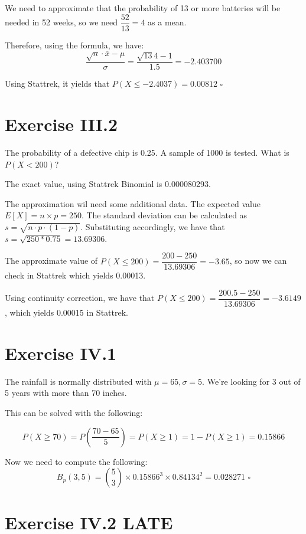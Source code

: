 \documentclass[titlepage, letterpaper]{article}
\newcommand{\qed}{\,\,\square}
\begin{document}
We need to approximate that the probability of 13 or more batteries will be needed in 52 weeks, so we need $\dfrac{52}{13} = 4$ as a mean.

Therefore, using the formula, we have:
$$\dfrac{\sqrt{n} \cdot \overline{x} - \mu}{\sigma} = \dfrac{\sqrt{13} 4 - 1}{1.5} = -2.403700$$

Using Stattrek, it yields that $P(X \leq -2.4037) = 0.00812 \qed$


\section{Exercise III.2} %
\label{sec:exercise_iii_2}
The probability of a defective chip is 0.25.
A sample of 1000 is tested.
What is $P(X<200)$?

The exact value, using Stattrek Binomial is 0.000080293.

The approximation wil need some additional data.
The expected value $E[X] = n \times p = 250$.
The standard deviation can be calculated as $s=\sqrt{n \cdot p \cdot (1-p)}$.
Substituting accordingly, we have that $s = \sqrt{250*0.75} = 13.69306$.

The approximate value of $P(X \leq 200) = \dfrac{200 - 250}{13.69306} = -3.65$, so now we can check in Stattrek which yields 0.00013.

Using continuity correction, we have that $P(X \leq 200) = \dfrac{200.5 - 250}{13.69306} = -3.6149$, which yields 0.00015 in Stattrek.

\section{Exercise IV.1} %
\label{sec:exercise_iv_1}
The rainfall is normally distributed with $\mu = 65, \sigma = 5$. We're looking for 3 out of 5 years with more than 70 inches.

This can be solved with the following:

$$P(X \geq 70) = P(\frac{70 - 65}{5}) = P(X \geq 1) = 1 - P(X \geq 1) = 0.15866$$

Now we need to compute the following:
$$B_p(3,5) = \binom{5}{3} \times 0.15866^3 \times 0.84134^2 = 0.028271 \qed$$

\section{Exercise IV.2 LATE} %
\label{sec:exercise_iv_2}
\end{document}
